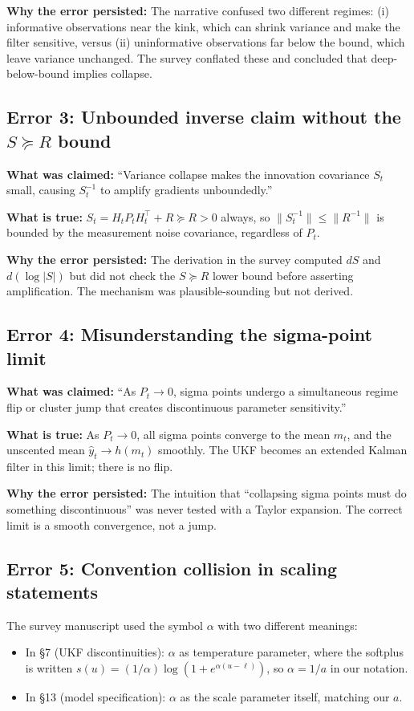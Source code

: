 \textbf{Why the error persisted:} The narrative confused two different regimes: (i) informative observations near the kink, which can shrink variance and make the filter sensitive, versus (ii) uninformative observations far below the bound, which leave variance unchanged. The survey conflated these and concluded that deep-below-bound implies collapse.

\subsection{Error 3: Unbounded inverse claim without the $S \succeq R$ bound}

\textbf{What was claimed:} ``Variance collapse makes the innovation covariance $S_t$ small, causing $S_t^{-1}$ to amplify gradients unboundedly.''

\textbf{What is true:} $S_t = H_t P_t H_t^\top + R \succeq R > 0$ always, so $\|S_t^{-1}\| \leq \|R^{-1}\|$ is bounded by the measurement noise covariance, regardless of $P_t$.

\textbf{Why the error persisted:} The derivation in the survey computed $dS$ and $d(\log |S|)$ but did not check the $S \succeq R$ lower bound before asserting amplification. The mechanism was plausible-sounding but not derived.

\subsection{Error 4: Misunderstanding the sigma-point limit}

\textbf{What was claimed:} ``As $P_t \to 0$, sigma points undergo a simultaneous regime flip or cluster jump that creates discontinuous parameter sensitivity.''

\textbf{What is true:} As $P_t \to 0$, all sigma points converge to the mean $m_t$, and the unscented mean $\hat{y}_t \to h(m_t)$ smoothly. The UKF becomes an extended Kalman filter in this limit; there is no flip.

\textbf{Why the error persisted:} The intuition that ``collapsing sigma points must do something discontinuous'' was never tested with a Taylor expansion. The correct limit is a smooth convergence, not a jump.


\subsection{Error 5: Convention collision in scaling statements}

The survey manuscript used the symbol $\alpha$ with two different meanings:
\begin{itemize}
\item In §7 (UKF discontinuities): $\alpha$ as temperature parameter, where the softplus is written $s(u) = (1/\alpha) \log(1 + e^{\alpha(u - \ell)})$, so $\alpha = 1/a$ in our notation.
\item In §13 (model specification): $\alpha$ as the scale parameter itself, matching our $a$.
\end{itemize}

